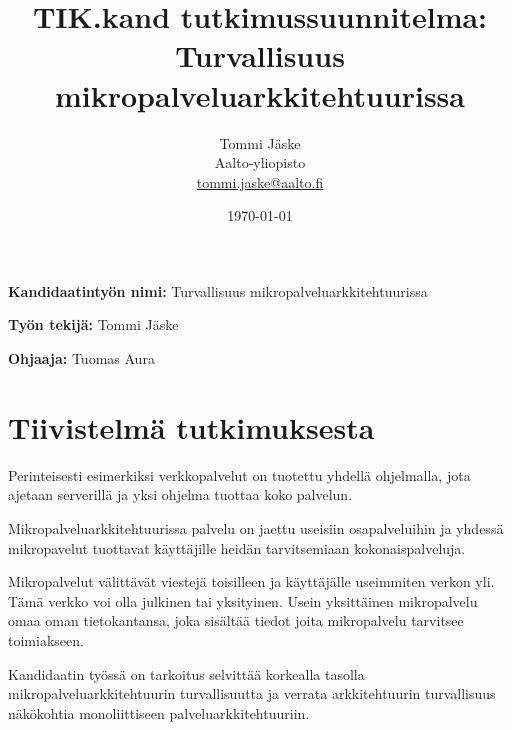 \documentclass[12pt,a4paper,finnish,oneside]{article}
\begin{document}

\title{TIK.kand tutkimussuunnitelma:\\[5mm]
Turvallisuus mikropalveluarkkitehtuurissa}

\author{Tommi Jäske\\
Aalto-yliopisto\\
\url{tommi.jaske@aalto.fi}}

\date{\today}

\maketitle



\vspace{10mm}

%

\textbf{Kandidaatintyön nimi:} Turvallisuus mikropalveluarkkitehtuurissa

\textbf{Työn tekijä:} Tommi Jäske

\textbf{Ohjaaja:} Tuomas Aura


\section{Tiivistelmä tutkimuksesta}

Perinteisesti esimerkiksi verkkopalvelut on tuotettu yhdellä ohjelmalla, 
jota ajetaan serverillä ja yksi ohjelma tuottaa koko palvelun.

Mikropalveluarkkitehtuurissa palvelu on jaettu useisiin osapalveluihin ja 
yhdessä mikropavelut tuottavat käyttäjille heidän tarvitsemiaan kokonaispalveluja.

Mikropalvelut välittävät viestejä toisilleen ja käyttäjälle useimmiten verkon yli. 
Tämä verkko voi olla julkinen tai yksityinen.
Usein yksittäinen mikropalvelu omaa oman tietokantansa, 
joka sisältää tiedot joita mikropalvelu tarvitsee toimiakseen.

Kandidaatin työssä on tarkoitus selvittää korkealla tasolla mikropalveluarkkitehtuurin 
turvallisuutta ja verrata arkkitehtuurin turvallisuus näkökohtia monoliittiseen palveluarkkitehtuuriin.
\end{document}
